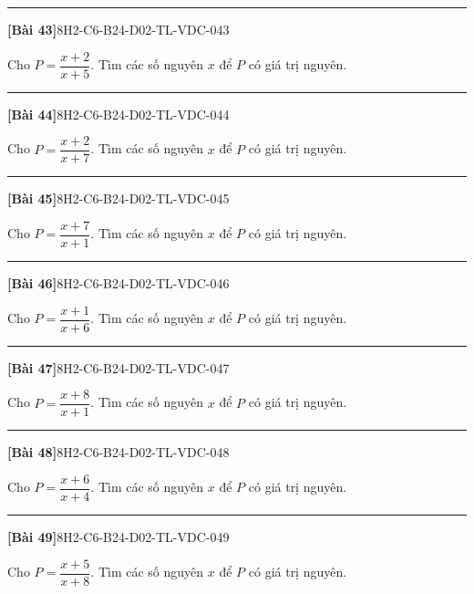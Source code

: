 \documentclass[12pt,a4paper]{article}
\newif\ifloigiai
\newenvironment{cauhoi}[2]{%
  \par\medskip\noindent\rule{\textwidth}{0.4pt}\par\nopagebreak
  \noindent\textbf{[#1]}\hfill{\scriptsize\ttfamily #2}\par\nopagebreak\smallskip}{\par}
\newcommand{\loigiai}[1]{\ifloigiai\par\smallskip\noindent\textit{Lời giải.} #1\par\fi}
\begin{document}
\begin{cauhoi}{Bài 43}{8H2-C6-B24-D02-TL-VDC-043}
Cho $P=\dfrac{x+2}{x+5}$. Tìm các số nguyên $x$ để $P$ có giá trị nguyên.
\loigiai{Viết $P=\dfrac{(x+5)-3}{x+5}=1+\dfrac{-3}{x+5}$. $P$ nguyên khi $x+5$ là ước của $-3$, tức $x+5\in\{-3; -1; 1; 3\}$. Suy ra $x\in\{-8; -6; -4; -2\}$.}
\end{cauhoi}
\begin{cauhoi}{Bài 44}{8H2-C6-B24-D02-TL-VDC-044}
Cho $P=\dfrac{x+2}{x+7}$. Tìm các số nguyên $x$ để $P$ có giá trị nguyên.
\loigiai{Viết $P=\dfrac{(x+7)-5}{x+7}=1+\dfrac{-5}{x+7}$. $P$ nguyên khi $x+7$ là ước của $-5$, tức $x+7\in\{-5; -1; 1; 5\}$. Suy ra $x\in\{-12; -8; -6; -2\}$.}
\end{cauhoi}
\begin{cauhoi}{Bài 45}{8H2-C6-B24-D02-TL-VDC-045}
Cho $P=\dfrac{x+7}{x+1}$. Tìm các số nguyên $x$ để $P$ có giá trị nguyên.
\loigiai{Viết $P=\dfrac{(x+1)+6}{x+1}=1+\dfrac{6}{x+1}$. $P$ nguyên khi $x+1$ là ước của $6$, tức $x+1\in\{-6; -3; -2; -1; 1; 2; 3; 6\}$. Suy ra $x\in\{-7; -4; -3; -2; 0; 1; 2; 5\}$.}
\end{cauhoi}
\begin{cauhoi}{Bài 46}{8H2-C6-B24-D02-TL-VDC-046}
Cho $P=\dfrac{x+1}{x+6}$. Tìm các số nguyên $x$ để $P$ có giá trị nguyên.
\loigiai{Viết $P=\dfrac{(x+6)-5}{x+6}=1+\dfrac{-5}{x+6}$. $P$ nguyên khi $x+6$ là ước của $-5$, tức $x+6\in\{-5; -1; 1; 5\}$. Suy ra $x\in\{-11; -7; -5; -1\}$.}
\end{cauhoi}
\begin{cauhoi}{Bài 47}{8H2-C6-B24-D02-TL-VDC-047}
Cho $P=\dfrac{x+8}{x+1}$. Tìm các số nguyên $x$ để $P$ có giá trị nguyên.
\loigiai{Viết $P=\dfrac{(x+1)+7}{x+1}=1+\dfrac{7}{x+1}$. $P$ nguyên khi $x+1$ là ước của $7$, tức $x+1\in\{-7; -1; 1; 7\}$. Suy ra $x\in\{-8; -2; 0; 6\}$.}
\end{cauhoi}
\begin{cauhoi}{Bài 48}{8H2-C6-B24-D02-TL-VDC-048}
Cho $P=\dfrac{x+6}{x+4}$. Tìm các số nguyên $x$ để $P$ có giá trị nguyên.
\loigiai{Viết $P=\dfrac{(x+4)+2}{x+4}=1+\dfrac{2}{x+4}$. $P$ nguyên khi $x+4$ là ước của $2$, tức $x+4\in\{-2; -1; 1; 2\}$. Suy ra $x\in\{-6; -5; -3; -2\}$.}
\end{cauhoi}
\begin{cauhoi}{Bài 49}{8H2-C6-B24-D02-TL-VDC-049}
Cho $P=\dfrac{x+5}{x+8}$. Tìm các số nguyên $x$ để $P$ có giá trị nguyên.
\loigiai{Viết $P=\dfrac{(x+8)-3}{x+8}=1+\dfrac{-3}{x+8}$. $P$ nguyên khi $x+8$ là ước của $-3$, tức $x+8\in\{-3; -1; 1; 3\}$. Suy ra $x\in\{-11; -9; -7; -5\}$.}
\end{cauhoi}
\end{document}
